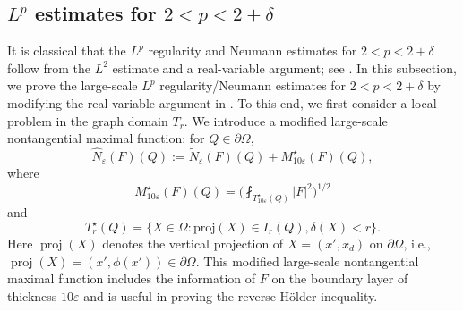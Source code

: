 \documentclass[reqno,12pt]{amsart} %
\theoremstyle{definition}
\theoremstyle{remark}
\numberwithin{equation}{section}
\newcommand{\e}{\varepsilon}
\newcommand{\jz}[1]{\textcolor{red}{#1}}
\DeclareMathOperator{\diam}{diam}
\DeclareMathOperator{\proj}{proj}
\begin{document}


\subsection{$L^p$ estimates for $2<p<2+\delta$}
It is classical that the $L^p$ regularity and Neumann estimates for $2<p<2+\delta$ follow from the $L^2$ estimate and a real-variable argument; see \cite[Theorem 5.3, 6.3]{KP93}.
In this subsection, we prove the large-scale $L^p$ regularity/Neumann estimates for $2<p<2+\delta$ by modifying the real-variable argument in \cite{KS11}. To this end, we first consider a local problem in the graph domain $T_r$. We introduce 
a modified large-scale nontangential maximal function: for $Q \in \partial \Omega$,
\begin{equation}\label{def.hatN}
    \widehat{N}_\e(F)(Q) := \widetilde{N}_\e( F)(Q) + M_{10\e}^\star(F)(Q),
\end{equation}
where %
\begin{equation}\label{def.Mstar}
    M_{10\e}^\star(F)(Q) = \bigg( \fint_{ T_{10\e}^\star(Q)} |F|^2 \bigg)^{1/2}
\end{equation}
and
\begin{equation}
    T_{r}^\star(Q) = \{ X\in \Omega: \text{proj}(X) \in I_r(Q), \delta(X) < r \}.
\end{equation}
Here $\proj(X)$ denotes the vertical projection of $X = (x',x_d)$ on $\partial \Omega$, i.e., $\proj(X) = (x', \phi(x')) \in \partial \Omega$.
This modified large-scale nontangential maximal function includes the information of $F$ on the boundary layer of thickness $10\e$ and is useful in proving the reverse H\"{o}lder inequality. 
\end{document}
